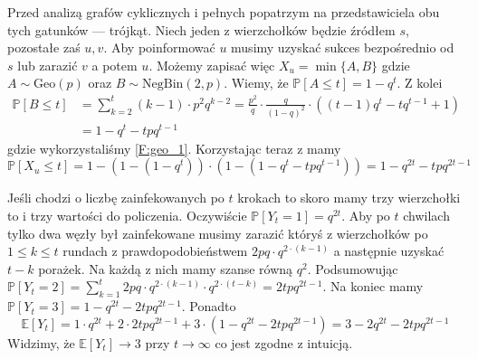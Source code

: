 Przed analizą grafów cyklicznych i pełnych popatrzym na przedstawiciela obu tych gatunków — trójkąt. Niech jeden z wierzchołków będzie źródłem $s$, pozostałe zaś $u,v$. Aby poinformować $u$ musimy uzyskać sukces bezpośrednio od $s$ lub zarazić $v$ a potem $u$. Możemy zapisać więc $X_u = \min\{A,B\}$ gdzie $A\sim \mathrm{Geo}(p)$ oraz $B\sim \mathrm{NegBin}(2,p)$. Wiemy, że $\mathbb{P}[A\le t] =1-q^t$. Z kolei 
\begin{equation*}
\begin{aligned}
\mathbb{P}[B\le t]
&= \sum_{k=2}^{t} (k-1)\cdot p^2q^{k-2}= \frac{p^2}{q}\cdot \frac{q}{(1-q)^2}\cdot((t-1)q^t-tq^{t-1}+1) \\
&=1-q^t-tpq^{t-1}
\end{aligned}
\end{equation*}
gdzie wykorzystaliśmy \cref{F:geo_1}. Korzystając teraz z  mamy
\[
    \mathbb{P}[X_u\le t] = 1 - (1-(1-q^t))\cdot (1-(1-q^t-tpq^{t-1})) = 1-q^{2t}-tpq^{2t-1}
\]

Jeśli chodzi o liczbę zainfekowanych po $t$ krokach to skoro mamy trzy wierzchołki to i trzy wartości do policzenia. Oczywiście $\mathbb{P}[Y_t=1]=q^{2t}$. Aby po $t$ chwilach tylko dwa węzły był zainfekowane musimy zarazić któryś z wierzchołków po $1\le k\le t$ rundach z prawdopodobieństwem $2pq\cdot q^{2\cdot(k-1)}$ a następnie uzyskać $t-k$ porażek. Na każdą z nich mamy szanse równą $q^2$. Podsumowując $\mathbb{P}[Y_t=2]=\sum_{k=1}^{t} 2pq\cdot q^{2\cdot(k-1)} \cdot q^{2\cdot(t-k)} = 2tpq^{2t-1}$. Na koniec mamy $\mathbb{P}[Y_t=3]=1-q^{2t}-2tpq^{2t-1}$. Ponadto
\[
    \mathbb{E}[Y_t] = 1 \cdot q^{2t} + 2 \cdot 2tpq^{2t-1} + 3\cdot (1-q^{2t}-2tpq^{2t-1}) = 3-2q^{2t}-2tpq^{2t-1}
\]
Widzimy, że $\mathbb{E}[Y_t] \to 3$ przy $t\to \infty$ co jest zgodne z intuicją.


